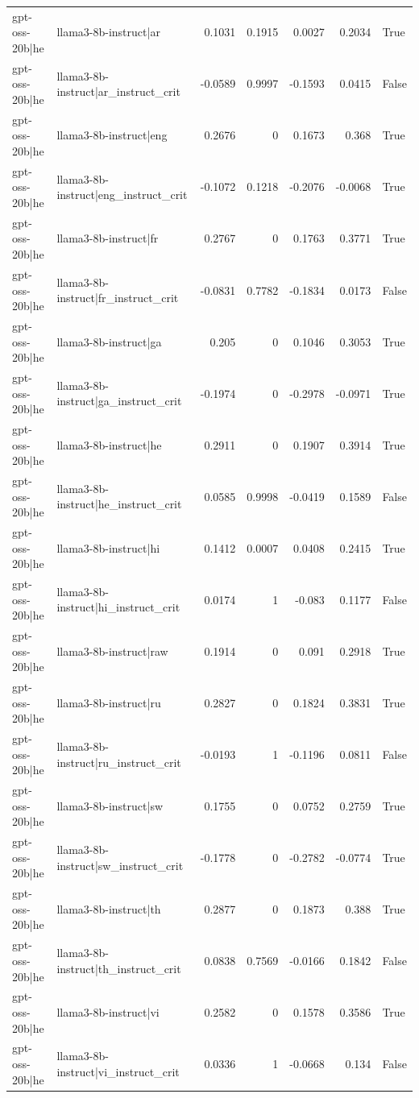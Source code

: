 \begin{table}
\begin{tabular}{l l r r r r l}
gpt-oss-20b|he & llama3-8b-instruct|ar & 0.1031 & 0.1915 & 0.0027 & 0.2034 & True \\
gpt-oss-20b|he & llama3-8b-instruct|ar_instruct_crit & -0.0589 & 0.9997 & -0.1593 & 0.0415 & False \\
gpt-oss-20b|he & llama3-8b-instruct|eng & 0.2676 & 0 & 0.1673 & 0.368 & True \\
gpt-oss-20b|he & llama3-8b-instruct|eng_instruct_crit & -0.1072 & 0.1218 & -0.2076 & -0.0068 & True \\
gpt-oss-20b|he & llama3-8b-instruct|fr & 0.2767 & 0 & 0.1763 & 0.3771 & True \\
gpt-oss-20b|he & llama3-8b-instruct|fr_instruct_crit & -0.0831 & 0.7782 & -0.1834 & 0.0173 & False \\
gpt-oss-20b|he & llama3-8b-instruct|ga & 0.205 & 0 & 0.1046 & 0.3053 & True \\
gpt-oss-20b|he & llama3-8b-instruct|ga_instruct_crit & -0.1974 & 0 & -0.2978 & -0.0971 & True \\
gpt-oss-20b|he & llama3-8b-instruct|he & 0.2911 & 0 & 0.1907 & 0.3914 & True \\
gpt-oss-20b|he & llama3-8b-instruct|he_instruct_crit & 0.0585 & 0.9998 & -0.0419 & 0.1589 & False \\
gpt-oss-20b|he & llama3-8b-instruct|hi & 0.1412 & 0.0007 & 0.0408 & 0.2415 & True \\
gpt-oss-20b|he & llama3-8b-instruct|hi_instruct_crit & 0.0174 & 1 & -0.083 & 0.1177 & False \\
gpt-oss-20b|he & llama3-8b-instruct|raw & 0.1914 & 0 & 0.091 & 0.2918 & True \\
gpt-oss-20b|he & llama3-8b-instruct|ru & 0.2827 & 0 & 0.1824 & 0.3831 & True \\
gpt-oss-20b|he & llama3-8b-instruct|ru_instruct_crit & -0.0193 & 1 & -0.1196 & 0.0811 & False \\
gpt-oss-20b|he & llama3-8b-instruct|sw & 0.1755 & 0 & 0.0752 & 0.2759 & True \\
gpt-oss-20b|he & llama3-8b-instruct|sw_instruct_crit & -0.1778 & 0 & -0.2782 & -0.0774 & True \\
gpt-oss-20b|he & llama3-8b-instruct|th & 0.2877 & 0 & 0.1873 & 0.388 & True \\
gpt-oss-20b|he & llama3-8b-instruct|th_instruct_crit & 0.0838 & 0.7569 & -0.0166 & 0.1842 & False \\
gpt-oss-20b|he & llama3-8b-instruct|vi & 0.2582 & 0 & 0.1578 & 0.3586 & True \\
gpt-oss-20b|he & llama3-8b-instruct|vi_instruct_crit & 0.0336 & 1 & -0.0668 & 0.134 & False \\

\end{tabular}
\end{table}
